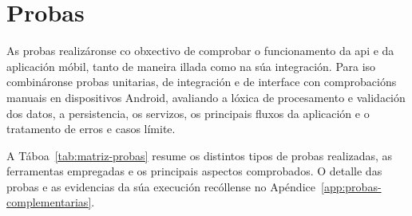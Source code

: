 \chapter{Probas}
\label{chap:probas}

As probas realizáronse co obxectivo de comprobar o funcionamento da \gls{api} e da aplicación móbil, tanto de maneira illada como na súa integración. Para iso combináronse probas unitarias, de integración e de interface con comprobacións manuais en dispositivos Android, avaliando a lóxica de procesamento e validación dos datos, a persistencia, os servizos, os principais fluxos da aplicación e o tratamento de erros e casos límite.

A Táboa~\ref{tab:matriz-probas} resume os distintos tipos de probas realizadas, as ferramentas empregadas e os principais aspectos comprobados. O detalle das probas e as evidencias da súa execución recóllense no Apéndice~\ref{app:probas-complementarias}.


